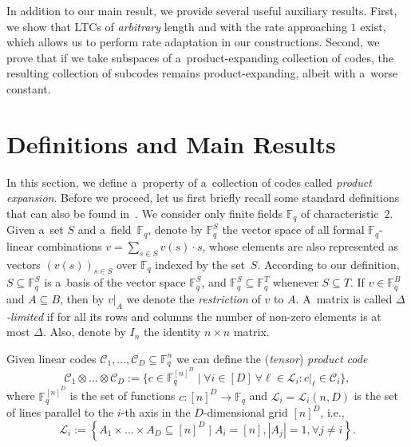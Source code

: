 \documentclass[conference]{IEEEtran}
\newcommand{\fbr}[1]{\left\{#1\right\}}
\theoremstyle{plain}
\theoremstyle{definition}
\theoremstyle{remark}
\newcommand{\abs}[1]{\left\lvert #1 \right\rvert}
\newcommand{\cC}{\mathcal{C}}
\newcommand{\cL}{\mathcal{L}}
\newcommand{\F}{\mathbb{F}}
\begin{document}
In addition to our main result, we provide several useful auxiliary results. First, we show that LTCs of \emph{arbitrary} length and with the rate approaching $1$ exist, which allows us to perform rate adaptation in our constructions. Second, we prove that if we take subspaces of a~product-expanding collection of codes, the resulting collection of subcodes remains product-expanding, albeit with a~worse constant. 



\section{Definitions and Main Results}
In this section, we define a~property of a~collection of codes called \emph{product expansion}. Before we proceed, let us first briefly recall some standard definitions that can also be found in~\cite{kalachevTwosidedRobustlyTestable2023}. 
We consider only finite fields $\F_q$ of characteristic~$2$. 
Given a~set $S$ and a~field~$\F_q$, denote by $\F_q^S$ the vector space of all formal $\F_q$-linear combinations $v = \sum_{s\in S} v(s)\cdot s$, whose elements are also represented as vectors $(v(s))_{s\in S}$ over $\F_q$ indexed by the set~$S$. According to our definition, $S \subseteq \F_q^S$ is a~basis of the vector space $\F_q^S$, and $\F_q^S \subseteq \F_q^T$ whenever $S\subseteq T$. If $v\in\F_q^B$ and $A\subseteq B$, then by $v|_A$ we denote the \emph{restriction} of $v$ to $A$. A~matrix is called \emph{$\Delta$-limited} if for all its rows and columns the number of non-zero elements is at most $\Delta$.  Also, denote by $I_n$ the identity $n\times n$ matrix. 

Given linear codes $\cC_1,\dots,\cC_D \subseteq \F_q^n$ we can define the (\emph{tensor}) \emph{product code} 
\[
\cC_1\otimes\dots\otimes\cC_D := \{c\in \F_q^{[n]^D} \mid \forall i\in [D]\ \forall \ell\in \cL_i\colon c|_\ell\in  \cC_i\},
\]
where $\F_q^{[n]^D}$ is the set of functions $c\colon [n]^D \to \F_q$  and $\cL_i = \cL_i(n, D)$ is the set of lines parallel to the $i$-th axis in the $D$-dimensional grid $[n]^D$, i.e., 
\[
\cL_i := \fbr{ A_1\times\dots\times A_D \subseteq [n]^D \mid  A_i\! =\! [n], \abs{A_j}\! =\! 1, \forall j\ne i}.
\]
\end{document}
